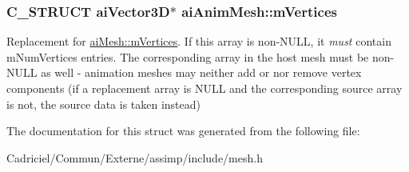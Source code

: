 \subsubsection[{\texorpdfstring{m\+Vertices}{mVertices}}]{\setlength{\rightskip}{0pt plus 5cm}C\+\_\+\+S\+T\+R\+U\+CT {\bf ai\+Vector3D}$\ast$ ai\+Anim\+Mesh\+::m\+Vertices}\hypertarget{structai_anim_mesh_a0ac2dd4c1afd23e6a9293b1d0ded3060}{}\label{structai_anim_mesh_a0ac2dd4c1afd23e6a9293b1d0ded3060}
Replacement for \hyperlink{structai_mesh_afd4588abb3e1c72821ae0234a3850662}{ai\+Mesh\+::m\+Vertices}. If this array is non-\/\+N\+U\+LL, it {\itshape must} contain m\+Num\+Vertices entries. The corresponding array in the host mesh must be non-\/\+N\+U\+LL as well -\/ animation meshes may neither add or nor remove vertex components (if a replacement array is N\+U\+LL and the corresponding source array is not, the source data is taken instead) 

The documentation for this struct was generated from the following file\+:\begin{DoxyCompactItemize}
\item 
Cadriciel/\+Commun/\+Externe/assimp/include/mesh.\+h\end{DoxyCompactItemize}
